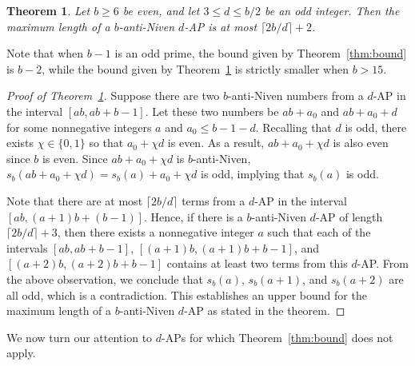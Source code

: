 \documentclass[12pt]{article}
\newtheorem{theorem}{Theorem}[section]
\theoremstyle{definition}
\begin{document}
\begin{theorem}\label{thm:smallerthanbound}
Let $b\geq6$ be even, and let $3\leq d\leq b/2$ be an odd integer. Then the maximum length of a $b$-anti-Niven $d$-AP is at most $\lceil2b/d\rceil+2$.
\end{theorem}
Note that when $b-1$ is an odd prime, the bound given by Theorem~\ref{thm:bound} is $b-2$, while the bound given by Theorem~\ref{thm:smallerthanbound} is strictly smaller when $b>15$.
\begin{proof}[Proof of Theorem~\ref{thm:smallerthanbound}]
Suppose there are two $b$-anti-Niven numbers from a $d$-AP in the interval $[ab,ab+b-1]$. Let these two numbers be $ab+a_0$ and $ab+a_0+d$ for some nonnegative integers $a$ and $a_0\leq b-1-d$. Recalling that $d$ is odd, there exists $\chi\in\{0,1\}$ so that $a_0+\chi d$ is even. As a result, $ab+a_0+\chi d$ is also even since $b$ is even. Since $ab+a_0+\chi d$ is $b$-anti-Niven, $s_b(ab+a_0+\chi d)=s_b(a)+a_0+\chi d$ is odd, implying that $s_b(a)$ is odd.

Note that there are at most $\lceil2b/d\rceil$ terms from a $d$-AP in the interval $[ab,(a+1)b+(b-1)]$. Hence, if there is a $b$-anti-Niven $d$-AP of length $\lceil2b/d\rceil+3$, then there exists a nonnegative integer $a$ such that each of the intervals $[ab,ab+b-1]$, $[(a+1)b,(a+1)b+b-1]$, and $[(a+2)b,(a+2)b+b-1]$ contains at least two terms from this $d$-AP. From the above observation, we conclude that $s_b(a)$, $s_b(a+1)$, and $s_b(a+2)$ are all odd, which is a contradiction. This establishes an upper bound for the maximum length of a $b$-anti-Niven $d$-AP as stated in the theorem.
\end{proof}

We now turn our attention to $d$-APs for which Theorem~\ref{thm:bound} does not apply.
\end{document}
